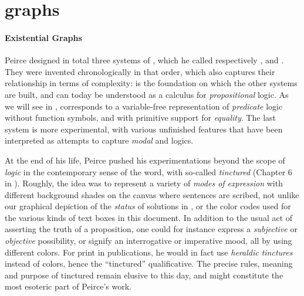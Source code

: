 \section{ graphs}

\paragraph{Existential Graphs}

\AP
Peirce designed in total three systems of , which he called respectively
,  and . They were invented
chronologically in that order, which also captures their relationship in terms
of complexity:  is the foundation on which the other systems are
built, and can today be understood as a  calculus for 
\emph{propositional} logic. As we will see in , 
corresponds to a variable-free representation of \emph{predicate} logic without
function symbols, and with primitive support for \emph{equality}. The last
system  is more experimental, with various unfinished features that
have been interpreted as attempts to capture \emph{modal}
 and \emph{} logics.

\begin{digression}
At the end of his life, Peirce pushed his experimentations beyond the scope of
\emph{logic} in the contemporary sense of the word, with so-called
\emph{tinctured}  (Chapter 6 in \cite{Roberts+1973}). Roughly,
the idea was to represent a variety of \emph{modes of expression} with different
background shades on the canvas where sentences are scribed, not unlike our
graphical depiction of the \emph{status} of solutions in ,
or the color codes used for the various kinds of text boxes in this document. In
addition to the usual act of asserting the truth of a proposition, one could for
instance express a \emph{subjective} or \emph{objective} possibility, or signify
an interrogative or imperative mood, all by using different colors. For print in
publications, he would in fact use \emph{heraldic tinctures} instead of colors,
hence the ``tinctured'' qualificative. The precise rules, meaning and purpose of
tinctured  remain elusive to this day, and might constitute the most
esoteric part of Peirce's work.
\end{digression}

